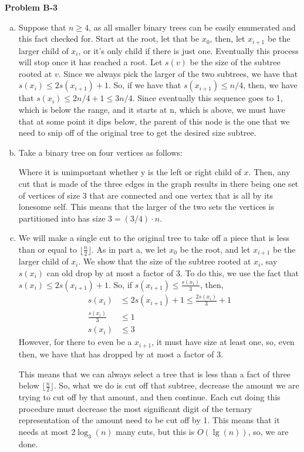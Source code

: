 \documentclass{article}
\begin{document}
\noindent\textbf{Problem B-3}\\
\begin{enumerate}[a.]
\item
Suppose that $n \ge 4$, as all smaller binary trees can be easily enumerated and this fact checked for. Start at the root, let that be $x_0$, then, let $x_{i+1}$ be the larger child of $x_i$, or it's only child if there is just one. Eventually this process will stop once it has reached a root. Let $s(v)$ be the size of the subtree rooted at $v$. Since we always pick the larger of the two subtrees, we have that $s(x_i) \le 2s(x_{i+1}) +1$. So, if we have that $s(x_{i+1}) \le n/4$, then, we have that $s(x_i) \le 2 n/4 +1 \le 3n/4$. Since eventually this sequence goes to 1, which is below the range, and it starts at n, which is above, we must have that at some point it dips below, the parent of this node is the one that we need to snip off of the original tree to get the desired size subtree.

\item
Take a binary tree on four vertices as follows:


Where it is unimportant whether y is the left or right child of $x$. Then, any cut that is made of the three edges in the graph results in there being one set of vertices of size 3 that are connected and one vertex that is all by its lonesome self. This means that the larger of the two sets the vertices is partitioned into has size $3 = (3/4) \cdot n$. 

\item
We will make a single cut to the original tree to take off a piece that is less than or equal to $\lfloor\frac{n}{2}\rfloor$. As in part a, we let $x_0$ be the root, and let $x_{i+1}$ be the larger child of $x_i$. We show that the size of the subtree rooted at $x_i$, say $s(x_i)$ can old drop by at most a factor of 3. To do this, we use the fact that $s(x_i) \le 2s(x_{i+1})+1$. So, if $s(x_{i+1}) \le \frac{s(x_{i})}{3}$, then,
\begin{align*}
s(x_i) &\le 2 s(x_{i+1}) +1 \le \frac{2s(x_i)}{3} +1\\
\frac{s(x_i)}{3} &\le 1\\
s(x_i) &\le 3 
\end{align*}
However, for there to even be a $x_{i+1}$, it must have size at least one, so, even then, we have that has dropped by at most a factor of 3.

This means that we can always select a tree that is less than a fact of three below $\lfloor \frac{n}{2}\rfloor$. So, what we do is cut off that subtree, decrease the amount we are trying to cut off by that amount, and then continue. Each cut doing this procedure must decrease the most significant digit of the ternary representation of the amount need to be cut off by 1. This means that it needs at most $2 \log_3(n)$ many cuts, but this is $O(\lg(n))$, so, we are done.
\end{enumerate}
\end{document}
